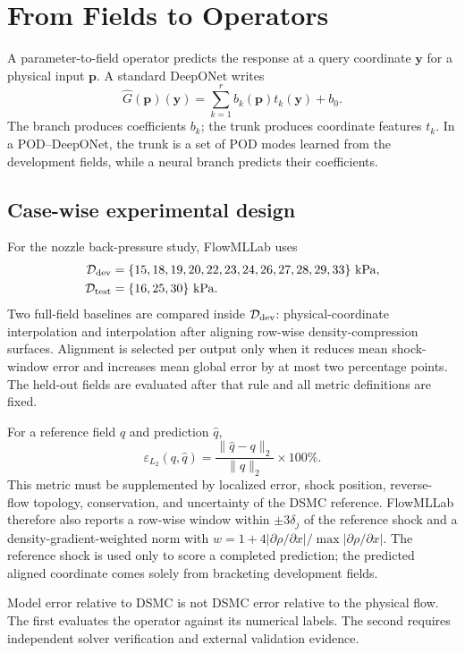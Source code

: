 \documentclass[11pt]{article}
\newcommand{\RelLtwo}{\varepsilon_{L_2}}
\begin{document}
\clearpage
\section{From Fields to Operators}
A parameter-to-field operator predicts the response at a query coordinate
$\bm y$ for a physical input $\bm p$. A standard DeepONet writes
\begin{equation}
\widehat{G}(\bm p)(\bm y)=\sum_{k=1}^{r}b_k(\bm p)t_k(\bm y)+b_0.
\end{equation}
The branch produces coefficients $b_k$; the trunk produces coordinate features
$t_k$. In a POD--DeepONet, the trunk is a set of POD modes learned from the
development fields, while a neural branch predicts their coefficients.

\subsection{Case-wise experimental design}
For the nozzle back-pressure study, FlowMLLab uses
\begin{align}
\mathcal D_{\rm dev}&=\{15,18,19,20,22,23,24,26,27,28,29,33\}\ \mathrm{kPa},\\
\mathcal D_{\rm test}&=\{16,25,30\}\ \mathrm{kPa}.
\end{align}
Two full-field baselines are compared inside $\mathcal D_{\rm dev}$:
physical-coordinate interpolation and interpolation after aligning row-wise
density-compression surfaces. Alignment is selected per output only when it
reduces mean shock-window error and increases mean global error by at most two
percentage points. The held-out fields are evaluated after that rule and all
metric definitions are fixed.

For a reference field $q$ and prediction $\widehat q$,
\begin{equation}
\RelLtwo(q,\widehat q)=
\frac{\lVert\widehat q-q\rVert_2}{\lVert q\rVert_2}\times100\%.
\end{equation}
This metric must be supplemented by localized error, shock position, reverse-
flow topology, conservation, and uncertainty of the DSMC reference.
FlowMLLab therefore also reports a row-wise window within $\pm3\delta_j$ of the
reference shock and a density-gradient-weighted norm with
$w=1+4|\partial\rho/\partial x|/\max|\partial\rho/\partial x|$. The reference
shock is used only to score a completed prediction; the predicted aligned
coordinate comes solely from bracketing development fields.

\begin{warningbox}
Model error relative to DSMC is not DSMC error relative to the physical flow.
The first evaluates the operator against its numerical labels. The second
requires independent solver verification and external validation evidence.
\end{warningbox}
\end{document}

